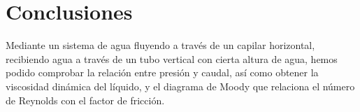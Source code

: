 \documentclass[a4paper,12pt,spanish]{article}
\begin{document}
	
	
	\section{Conclusiones}
	
	Mediante un sistema de agua fluyendo a través de un capilar horizontal, recibiendo agua a través de un tubo vertical con cierta altura de agua, hemos podido comprobar la relación entre presión y caudal, así como obtener la viscosidad dinámica del líquido, y el diagrama de Moody que relaciona el número de Reynolds con el factor de fricción.
	
	
	
	
\end{document}
